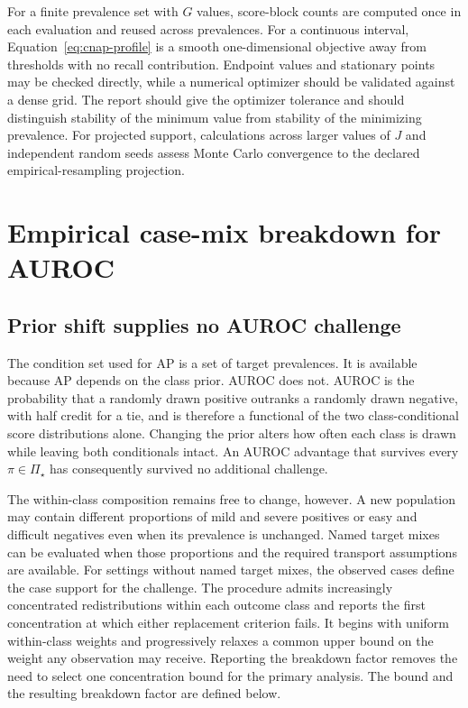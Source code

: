 \documentclass[11pt]{article}
\newcommand{\PSet}{\Pi_\star}
\theoremstyle{remark}
\begin{document}
For a finite prevalence set with $G$ values, score-block counts are computed once in each evaluation and reused across prevalences. For a continuous interval, Equation~\eqref{eq:cnap-profile} is a smooth one-dimensional objective away from thresholds with no recall contribution. Endpoint values and stationary points may be checked directly, while a numerical optimizer should be validated against a dense grid. The report should give the optimizer tolerance and should distinguish stability of the minimum value from stability of the minimizing prevalence. For projected support, calculations across larger values of $J$ and independent random seeds assess Monte Carlo convergence to the declared empirical-resampling projection.

\section{Empirical case-mix breakdown for AUROC}
\label{app:auroc}

\subsection{Prior shift supplies no AUROC challenge}

The condition set used for AP is a set of target prevalences. It is available
because AP depends on the class prior. AUROC does not. AUROC is the probability
that a randomly drawn positive outranks a randomly drawn negative, with half
credit for a tie, and is therefore a functional of the two class-conditional
score distributions alone. Changing the prior alters how often each class is
drawn while leaving both conditionals intact. An AUROC advantage that survives
every $\pi\in\PSet$ has consequently survived no additional challenge.

The within-class composition remains free to change, however. A new population
may contain different proportions of mild and severe positives or easy and
difficult negatives even when its prevalence is unchanged. Named target mixes
can be evaluated when those proportions and the required transport assumptions
are available. For settings without named target mixes, the observed cases
define the case support for the challenge. The procedure admits increasingly
concentrated redistributions within each outcome class and reports the first
concentration at which either replacement criterion fails. It begins with
uniform within-class weights and progressively relaxes a common upper bound on
the weight any observation may receive. Reporting the breakdown factor removes
the need to select one concentration bound for the primary analysis. The bound
and the resulting breakdown factor are defined below.
\end{document}
